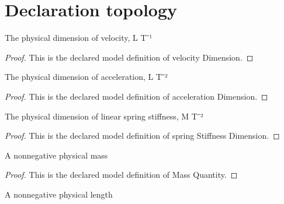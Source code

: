 \section{Declaration topology}
\begin{definition}
  \label{def:physics:phyx-mini-0255:phyxminiproblems-problemphyxmini0255-velocitydimension}
  The physical dimension of velocity, L T⁻¹
\end{definition}
\begin{proof}
  This is the declared model definition of velocity Dimension.
\end{proof}
\begin{definition}
  \label{def:physics:phyx-mini-0255:phyxminiproblems-problemphyxmini0255-accelerationdimension}
  The physical dimension of acceleration, L T⁻²
\end{definition}
\begin{proof}
  This is the declared model definition of acceleration Dimension.
\end{proof}
\begin{definition}
  \label{def:physics:phyx-mini-0255:phyxminiproblems-problemphyxmini0255-springstiffnessdimension}
  The physical dimension of linear spring stiffness, M T⁻²
\end{definition}
\begin{proof}
  This is the declared model definition of spring Stiffness Dimension.
\end{proof}
\begin{definition}
  \label{def:physics:phyx-mini-0255:phyxminiproblems-problemphyxmini0255-massquantity}
  A nonnegative physical mass
\end{definition}
\begin{proof}
  This is the declared model definition of Mass Quantity.
\end{proof}
\begin{definition}
  \label{def:physics:phyx-mini-0255:phyxminiproblems-problemphyxmini0255-lengthquantity}
  A nonnegative physical length
\end{definition}
